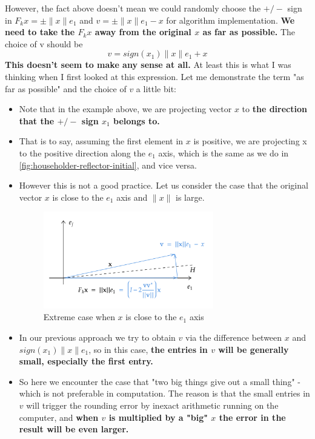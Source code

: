 \noindent However, the fact above doesn't mean we could randomly choose the $+/-$ sign in  $F_kx = \pm \|x\|e_1$ and \(v = \pm \|x\|e_1 - x\)  for algorithm implementation. \textbf{We need to take the \(F_kx\) away from the original \(x\) as far as possible.} The choice of v should be
\[
  v = sign(x_1)\|x\|e_1 + x
\]   
\textbf{This doesn't seem to make any sense at all.} At least this is what I was thinking when I first looked at this expression. Let me demonstrate the term "as far as possible" and the choice of \(v\)  a little bit:
\begin{itemize}
  \item Note that in the example above, we are projecting vector $x$ to \textbf{the direction that the $+/-$ sign  $x_1$ belongs to.}
  \item That is to say, assuming the first element in $x$ is positive, we are projecting x to the positive direction along the $e_1$ axis, which is the same as we do in \autoref{fig:householder-reflector-initial}, and vice versa.
  \item However this is not a good practice. Let us consider the case that the original vector $x$ is close to the $e_1$ axis and $ \|x\|$ is large. 
    \begin{figure}[H]
      \centering
      \includegraphics[width=0.7\textwidth]{./imgs/householder-reflector-extreme-case.png}
      \caption{Extreme case when $x$ is close to the $e_1$ axis}
      \label{fig:householder-reflector-extreme-case}
    \end{figure}
  \item In our previous approach we try to obtain $v$ via the difference between $x$ and $sign(x_1)\|x\|e_1$, so in this case, \textbf{the entries in $v$ will be generally small, especially the first entry.}
  \item So here we encounter the case that "two big things give out a small thing" - which is not preferable in computation. The reason is that the small entries in $v$ will trigger the rounding error by inexact arithmetic running on the computer, and \textbf{when $v$ is multiplied by a "big" $x$ the error in the result will be even larger.}

\end{itemize}
